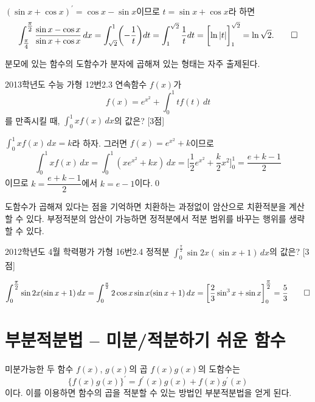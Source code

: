 \documentclass{article}
\begin{document}
\begin{sol}
	$(\sin x +\cos x)^{\prime}=\cos x-\sin x$이므로 $t=\sin x+\cos x$라 하면
	\[
		\int_{\tfrac{\pi}{4}}^{\tfrac{\pi}{2}}\frac{\sin x-\cos x}{\sin x+\cos x}\,dx=\int_{\sqrt2}^1\biggl(-\frac{1}{t}\biggr)dt=\int_1^{\sqrt2}\frac{1}{t}dt=\biggl[\ln\vert t\vert\biggr]_1^{\sqrt2}=\ln\sqrt2.\qed
	\]
\end{sol}

\begin{remark}
	분모에 있는 함수의 도함수가 분자에 곱해져 있는 형태는 자주 출제된다.
\end{remark}

\begin{exc}{2013학년도 수능 가형 12번}{2.3}
	연속함수 $f(x)$가
	\[
		f(x)=e^{x^2}+\int_0^1tf(t)\,dt
	\]
	를 만족시킬 때, $\displaystyle\int_0^1xf(x)\,dx$의 값은? [3점]
\end{exc}

\begin{sol}
	$\displaystyle\int_0^1xf(x)\,dx=k$라 하자. 그러면 $f(x)=e^{x^2}+k$이므로
	\[
		\int_0^1xf(x)\,dx=\int_0^1(xe^{x^2}+kx)\,dx=\biggl[\frac{1}{2}e^{x^2}+\frac{k}{2}x^2\biggr]_0^1=\frac{e+k-1}{2}
	\]
	이므로 $k=\dfrac{e+k-1}{2}$에서 $k=e-1$이다.\qed
\end{sol}

\begin{remark}
	도함수가 곱해져 있다는 점을 기억하면 치환하는 과정없이 암산으로 치환적분을 계산할 수 있다. 부정적분의 암산이 가능하면 정적분에서 적분 범위를 바꾸는 행위를 생략할 수 있다.
\end{remark}

\begin{exc}{2012학년도 4월 학력평가 가형 16번}{2.4}
	정적분 $\displaystyle\int_0^{\tfrac{\pi}{2}}\sin 2x(\sin x+1)\,dx$의 값은? [3점]
\end{exc}

\begin{sol}
	\[
		\int_0^{\tfrac{\pi}{2}}\sin 2x(\sin x+1)\,dx=\int_0^{\frac{\pi}{2}}2\cos x\sin x(\sin x+1)\,dx=\biggl[\frac{2}{3}\sin^3x+\sin x\biggr]_0^{\tfrac{\pi}{2}}=\frac{5}{3}\qed
	\]
\end{sol}

\section{부분적분법 -- 미분/적분하기 쉬운 함수}
미분가능한 두 함수 $f(x)$, $g(x)$의 곱 $f(x)g(x)$의 도함수는
\[
	\{f(x)g(x)\}^{\prime}=f^{\prime}(x)g(x)+f(x)g^{\prime}(x)
\]
이다. 이를 이용하면 함수의 곱을 적분할 수 있는 방법인 부분적분법을 얻게 된다.
\end{document}
